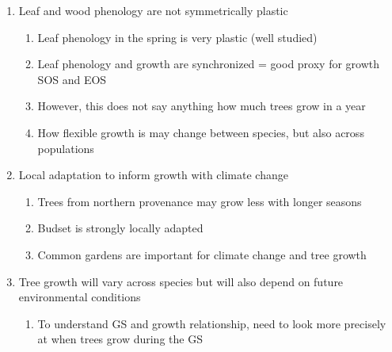 \begin{enumerate}
\begin{enumerate}
  \item Competition may offset extra days to grow especially for below canopy trees
  
  \item Length and speed of growth is physiologically (or genetically?) controlled
  
  \item And how much phenology can track these changing conditions matters
  
  \end{enumerate}

\item Leaf and wood phenology are not symmetrically plastic
  \begin{enumerate}
  
  \item Leaf phenology in the spring is very plastic (well studied)
  
  \item Leaf phenology and growth are synchronized = good proxy for growth SOS and EOS
  
  \item However, this does not say anything how much trees grow in a year
  
  \item How flexible growth is may change between species, but also across populations
  \end{enumerate}

\item Local adaptation to inform growth with climate change
  \begin{enumerate}
  
  \item Trees from northern provenance may grow less with longer seasons
  
  \item Budset is strongly locally adapted
  
  \item Common gardens are important for climate change and tree growth
  
  \end{enumerate}

\item Tree growth will vary across species but will also depend on future environmental conditions   %
  \begin{enumerate}
  \item To understand GS and growth relationship, need to look more precisely at when trees grow during the GS
  

\end{enumerate}
\end{enumerate}
